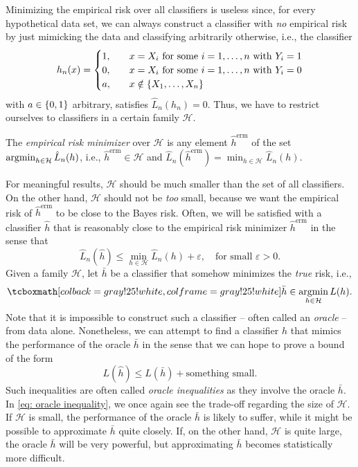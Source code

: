 Minimizing the empirical risk over all classifiers is useless since, for every hypothetical data set, we can always construct a classifier with \emph{no} empirical risk by just mimicking the data and classifying arbitrarily otherwise, i.e., the classifier
\[
    h_n(x) = \begin{cases}
        1, \quad &x = X_i \text{ for some } i = 1, \dots, n \text{ with } Y_i = 1 \\
        0, \quad &x = X_i \text{ for some } i = 1, \dots, n \text{ with } Y_i = 0 \\
        a, \quad &x \notin \left\{X_1, \dots, X_n\right\}
    \end{cases}
\]
with $a \in \left\{0, 1\right\}$ arbitrary, satisfies $\hat L_n(h_n) = 0$. Thus, we have to restrict ourselves to classifiers in a certain family $\mathcal{H}$.

\begin{definition}
The \emph{empirical risk minimizer} over $\mathcal{H}$ is any element $\hat h^{\text{erm}}$ of the set $\operatorname*{argmin}_{h \in \mathcal{H}} \hat L_n(h)$, i.e., $\hat h^{\text{erm}} \in \mathcal{H}$ and $\hat L_n(\hat h^{\text{erm}}) = \min_{h \in \mathcal{H}} \hat L_n(h)$.
\end{definition}

For meaningful results, $\mathcal{H}$ should be much smaller than the set of all classifiers. On the other hand, $\mathcal{H}$ should not be \emph{too} small, because we want the empirical risk of $\hat h^{\text{erm}}$ to be close to the Bayes risk. Often, we will be satisfied with a classifier $\hat h$ that is reasonably close to the empirical risk minimizer $\hat h^{\text{erm}}$ in the sense that
\[
    \hat L_n(\hat h) \leq \min_{h \in \mathcal{H}} \hat L_n(h) + \varepsilon, \quad \text{for small } \varepsilon > 0.
\]
Given a family $\mathcal{H}$, let $\bar h$ be a classifier that somehow minimizes the \emph{true} risk, i.e.,
\[
    \highlightMath{
        \bar h \in \argmin_{h\in \mathcal{H}} L(h).
    }
\]
Note that it is impossible to construct such a classifier -- often called an \emph{oracle} -- from data alone. Nonetheless, we can attempt to find a classifier $\hat h$ that mimics the performance of the oracle $\bar h$ in the sense that we can hope to prove a bound of the form
\begin{equation}
    \label{eq: oracle inequality}
    L(\hat h) \leq L(\bar h) + \text{something small}.
\end{equation}
Such inequalities are often called \emph{oracle inequalities} as they involve the oracle $\bar h$. In \eqref{eq: oracle inequality}, we once again see the trade-off regarding the size of $\mathcal{H}$. If $\mathcal{H}$ is small, the performance of the oracle $\bar h$ is likely to suffer, while it might be possible to approximate $\bar h$ quite closely. If, on the other hand, $\mathcal{H}$ is quite large, the oracle $\bar h$ will be very powerful, but approximating $\bar h$ becomes statistically more difficult.

